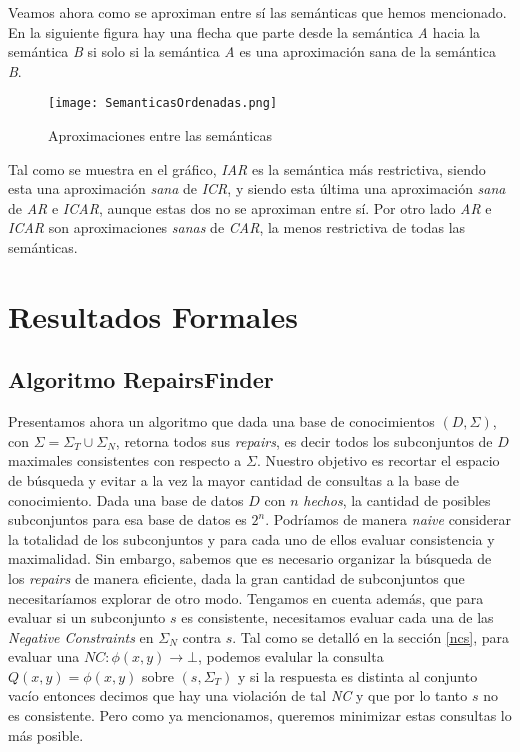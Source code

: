 \documentclass[11pt,a4paper,twoside]{tesis}
\begin{document}
Veamos ahora como se aproximan entre sí las semánticas que hemos mencionado. En la siguiente figura hay una flecha que parte desde la semántica \textit{A} hacia la semántica \textit{B} si solo si la semántica \textit{A} es una aproximación sana de la semántica \textit{B}.


\begin{figure}[ht]
    \texttt{[image: SemanticasOrdenadas.png]}
    \centering
    \caption{Aproximaciones entre las semánticas}
    \label{fig:aproximaciones}
\end{figure}

Tal como se muestra en el gráfico, \textit{IAR} es la semántica más restrictiva, siendo esta una aproximación \textit{sana} de \textit{ICR}, y siendo esta última una aproximación \textit{sana} de \textit{AR} e \textit{ICAR}, aunque estas dos no se aproximan entre sí. Por otro lado \textit{AR} e \textit{ICAR} son aproximaciones \textit{sanas} de \textit{CAR}, la menos restrictiva de todas las semánticas. 

\chapter{Resultados Formales}
\section{Algoritmo RepairsFinder}\label{repairs_finder_section}
Presentamos ahora un algoritmo que dada una base de conocimientos $(D, \Sigma)$, con $\Sigma = \Sigma_T \cup \Sigma_N$, retorna todos sus \textit{repairs}, es decir todos los subconjuntos de $D$ maximales consistentes con respecto a $\Sigma$. Nuestro objetivo es recortar el espacio de búsqueda y evitar a la vez la mayor cantidad de consultas a la base de conocimiento. Dada una base de datos $D$ con $n$ \textit{hechos}, la cantidad de posibles subconjuntos para esa base de datos es $2^n$. Podríamos de manera \textit{naive} considerar la totalidad de los subconjuntos y para cada uno de ellos evaluar consistencia y maximalidad. Sin embargo, sabemos que es necesario organizar la búsqueda de los \textit{repairs} de manera eficiente, dada la gran cantidad de subconjuntos que necesitaríamos explorar de otro modo. Tengamos en cuenta además, que para evaluar si un subconjunto $s$ es consistente, necesitamos evaluar cada una de las \textit{Negative Constraints} en $\Sigma_N$ contra $s$. Tal como se detalló en la sección \ref{ncs}, para evaluar una $NC: \phi(x, y) \rightarrow \bot$, podemos evalular la consulta $Q(x, y) = \phi(x, y)$ sobre $(s, \Sigma_T)$ y si la respuesta es distinta al conjunto vacío entonces decimos que hay una violación de tal \textit{NC} y que por lo tanto $s$ no es consistente. Pero como ya mencionamos, queremos minimizar estas consultas lo más posible.
\end{document}

